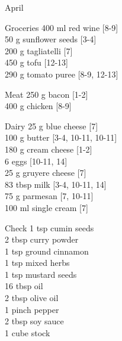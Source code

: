 \begin{menu}{April}
\begin{shoppinglist}{Groceries}
      400 ml red wine {\scriptsize[8-9]}\\
      50 g sunflower seeds {\scriptsize[3-4]}\\
      200 g tagliatelli {\scriptsize[7]}\\
      450 g tofu {\scriptsize[12-13]}\\
      290 g tomato puree {\scriptsize[8-9, 12-13]}\\
      \end{shoppinglist}%
      \par\vfil %
      \begin{shoppinglist}{Meat}
      250 g bacon {\scriptsize[1-2]}\\
      400 g chicken {\scriptsize[8-9]}\\
      \end{shoppinglist}%
      \begin{shoppinglist}{Dairy}
      25 g blue cheese {\scriptsize[7]}\\
      100 g butter {\scriptsize[3-4, 10-11, 10-11]}\\
      180 g cream cheese {\scriptsize[1-2]}\\
      6  eggs {\scriptsize[10-11, 14]}\\
      25 g gruyere cheese {\scriptsize[7]}\\
      83 tbsp milk {\scriptsize[3-4, 10-11, 14]}\\
      75 g parmesan {\scriptsize[7, 10-11]}\\
      100 ml single cream {\scriptsize[7]}\\
      \end{shoppinglist}%
      \par\vfil %
      \vfil\clearpage %
      \begin{shoppinglist}{Check}
      1 tsp cumin seeds \\
      2 tbsp curry powder \\
      1 tsp ground cinnamon \\
      1 tsp mixed herbs \\
      1 tsp mustard seeds \\
      16 tbsp oil \\
      2 tbsp olive oil \\
      1 pinch pepper \\
      2 tbsp soy sauce \\
      1 cube stock \\
      \end{shoppinglist}%

\end{menu}
